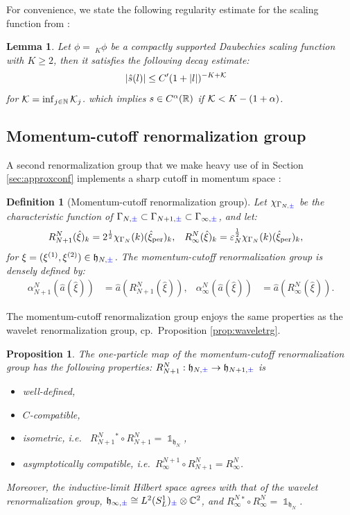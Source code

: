 \documentclass[a4paper, 11pt]{article}
\newcommand{\fh}{\mathfrak{h}}
\DeclareMathOperator{\1}{\mathds{1}}
\DeclareMathOperator{\per}{per}
\newtheorem{prop}[thm]{Proposition}
\newtheorem{lemma}[thm]{Lemma}
\newtheorem{defn}[thm]{Definition}
\begin{document}
For convenience, we state the following regularity estimate for the scaling function from \cite[Lemma 7.1.2]{DaubechiesTenLecturesOn}:
\begin{lemma}
\label{lem:decay}
Let $\phi =\!\ _{K}\phi$ be a compactly supported Daubechies scaling function with $K\geq2$, then it satisfies the following decay estimate:
\begin{align}
\label{eq:decaysf}
|\hat{s}(l)| & \leq C'(1+|l|)^{-K+\mathcal{K}}
\end{align}
for $\mathcal{K} = \inf_{j\in\mathbb{N}}\mathcal{K}_{j}$. which implies $s\in C^{\alpha}(\mathbb{R})$ if $\mathcal{K} < K-(1+\alpha)$.
\end{lemma}

\subsection{Momentum-cutoff renormalization group}
\label{sec:momcut}
A second renormalization group that we make heavy use of in Section \ref{sec:approxconf} implements a sharp cutoff in momentum space \cite{MorinelliScalingLimitsOf}: 
\begin{defn}[Momentum-cutoff renormalization group]
\label{def:momrg}
Let $\chi_{\Gamma_{N,{\color{blue}\pm}}}$ be the characteristic function of $\Gamma_{N,{\color{blue}\pm}}\subset\Gamma_{N+1,{\color{blue}\pm}}\subset\Gamma_{\infty,{\color{blue}\pm}}$, and let:
\begin{align}
\label{eq:momrg1p}
R^{N}_{N+1}(\hat{\xi})_{k} & = 2^{\frac{1}{2}}\chi_{\Gamma_{N}}(k)(\hat{\xi}_{\per})_{k}, & R^{N}_{\infty}(\hat{\xi})_{k} & = \vep_{N}^{\frac{1}{2}}\chi_{\Gamma_{N}}(k)(\hat{\xi}_{\per})_{k},
\end{align}
for $\xi=(\xi^{(1)},\xi^{(2)})\in\fh_{N,{\color{blue}\pm}}$. The \emph{momentum-cutoff renormalization group} is densely defined by:
\begin{align}
\label{eq:momrg}
\alpha^{N}_{N+1}(\hat{a}(\hat{\xi})) & = \hat{a}(R^{N}_{N+1}(\hat{\xi})), & \alpha^{N}_{\infty}(\hat{a}(\hat{\xi})) & = \hat{a}(R^{N}_{\infty}(\hat{\xi})).
\end{align}
\end{defn}
The momentum-cutoff renormalization group enjoys the same properties as the wavelet renormalization group, cp.~Proposition \ref{prop:waveletrg}.
\begin{prop}
\label{prop:momrg}
The one-particle map of the momentum-cutoff renormalization group has the following properties: $R^{N}_{N+1}:\fh_{N,{\color{blue}\pm}}\rightarrow\fh_{N+1,{\color{blue}\pm}}$ is
\begin{itemize}
	\item[1.] well-defined,
	\item[2.] $C$-compatible,
	\item[3.] isometric, i.e.~ $R^{N}_{N+1}{}^{\!\!*}\circ R^{N}_{N+1} = \1_{\fh_{N}}$, 
	\item[4.] asymptotically compatible, i.e.~$R^{N+1}_{\infty}\circ R^{N}_{N+1} = R^{N}_{\infty}$.
\end{itemize}
Moreover, the inductive-limit Hilbert space agrees with that of the wavelet renormalization group, $\fh_{\infty,{\color{blue}\pm}}\cong L^{2}(S^{1}_{L})_{{\color{blue}\pm}}\otimes\C^{2}$, and $R^{N}_{\infty}{}^{*}\circ R^{N}_{\infty} = \1_{\fh_{N}}$.
\end{prop}
\end{document}
